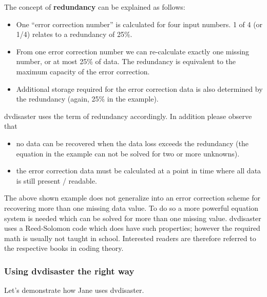 \bigskip

The concept of {\bf redundancy} can be explained as follows:

\begin{itemize}
\item  One ``error correction number'' is calculated for four input
  numbers. 1 of 4 (or 1/4) relates to a redundancy of 25\%.
\item  From one error correction number we can re-calculate exactly
  one missing number, or at most 25\% of data. The redundancy
  is equivalent to the maximum capacity of the error correction.
\item  Additional storage required for the error correction data is
  also determined by the redundancy (again, 25\% in the example).
\end{itemize}

dvdisaster uses the term of redundancy accordingly.
In addition please observe that

\begin{itemize}
\item  no data can be recovered when the data loss exceeds the
  redundancy (the equation in the example can not be solved for
  two or more unknowns).
\item the error correction data must be calculated at a
  point in time where all data is still present / readable.
\end{itemize}
  
The above shown example does not generalize into an error correction
scheme for recovering more than one missing data value. To do so a
more powerful equation system is needed which can be solved for more
than one missing value. dvdisaster uses a Reed-Solomon code which
does have such properties; however the required math is usually
not taught in school. Interested readers are therefore referred
to the respective books in coding theory. 

\newpage
\subsubsection{Using dvdisaster the right way}
\label{bigpicture-goodusage}

Let's demonstrate how Jane uses dvdisaster.

\bigskip

